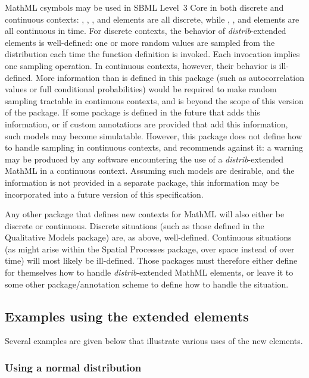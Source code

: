 \documentclass[draftspec]{sbmlpkgspec}
\newcommand{\sbmlthreecore}{SBML Level~3 Core\xspace}
\newcommand{\distribshort}{\emph{distrib}\xspace}
\newcommand{\mathml}{MathML\xspace}
\begin{document}
\mathml csymbols may be used in \sbmlthreecore in both discrete and continuous contexts:  \InitialAssignment, \EventAssignment, \Priority, and \Delay elements are all discrete, while \Rule, \KineticLaw, and \Trigger elements are all continuous in time.  For discrete contexts, the behavior of \distribshort-extended \FunctionDefinition elements is well-defined:  one or more random values are sampled from the distribution each time the function definition is invoked. Each invocation implies one sampling operation.  In continuous contexts, however, their behavior is ill-defined.  More information than is defined in this package (such as autocorrelation values or full conditional probabilities) would be required to make random sampling tractable in continuous contexts, and is beyond the scope of this version of the package.  If some package is defined in the future that adds this information, or if custom annotations are provided that add this information, such models may become simulatable.  However, this package does not define how to handle sampling in continuous contexts, and recommends against it: a warning may be produced by any software encountering the use of a \distribshort-extended \mathml in a continuous context.  Assuming such models are desirable, and the information is not provided in a separate package, this information may be incorporated into a future version of this specification.

Any other package that defines new contexts for MathML will also either be discrete or continuous.  Discrete situations (such as those defined in the Qualitative Models package) are, as above, well-defined.  Continuous situations (as might arise within the Spatial Processes package, over space instead of over time) will most likely be ill-defined.  Those packages must therefore either define for themselves how to handle \distribshort-extended \mathml elements, or leave it to some other package/annotation scheme to define how to handle the situation.



\subsection{Examples using the extended  elements}
\label{sec:cs-examples}

Several examples are given below that illustrate various uses of the new  elements.

\subsubsection{Using a normal distribution}
\end{document}
